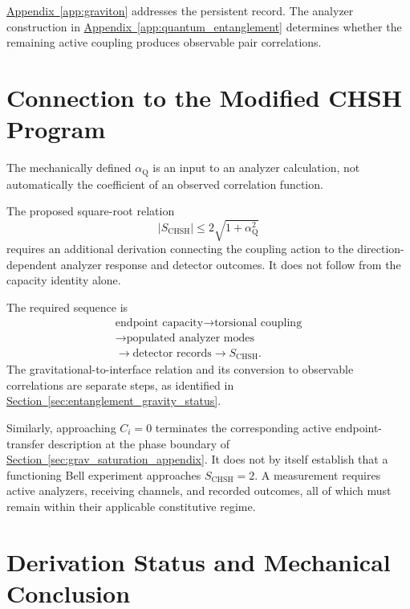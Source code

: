 \hyperref[app:graviton]{Appendix~\ref*{app:graviton}} addresses the persistent record. The analyzer construction in \hyperref[app:quantum_entanglement]{Appendix~\ref*{app:quantum_entanglement}} determines whether the remaining active coupling produces observable pair correlations.

\section{Connection to the Modified CHSH Program}

The mechanically defined $\alpha_{\mathrm Q}$ is an input to an analyzer calculation, not automatically the coefficient of an observed correlation function.

The proposed square-root relation
\begin{equation}
    |S_{\mathrm{CHSH}}|\leq2\sqrt{1+\alpha_{\mathrm Q}^{2}}
\end{equation}
requires an additional derivation connecting the coupling action to the direction-dependent analyzer response and detector outcomes. It does not follow from the capacity identity alone.

The required sequence is
\begin{equation}
    \boxed{
    \begin{gathered}
    \text{endpoint capacity}
    \longrightarrow\text{torsional coupling}\\
    \longrightarrow\text{populated analyzer modes}\\
    \longrightarrow\text{detector records}
    \longrightarrow S_{\mathrm{CHSH}}.
    \end{gathered}
    }
\end{equation}
The gravitational-to-interface relation and its conversion to observable correlations are separate steps, as identified in \hyperref[sec:entanglement_gravity_status]{Section~\ref*{sec:entanglement_gravity_status}}.

Similarly, approaching $C_i=0$ terminates the corresponding active endpoint-transfer description at the phase boundary of \hyperref[sec:grav_saturation_appendix]{Section~\ref*{sec:grav_saturation_appendix}}. It does not by itself establish that a functioning Bell experiment approaches $S_{\mathrm{CHSH}}=2$. A measurement requires active analyzers, receiving channels, and recorded outcomes, all of which must remain within their applicable constitutive regime.

\section{Derivation Status and Mechanical Conclusion}

